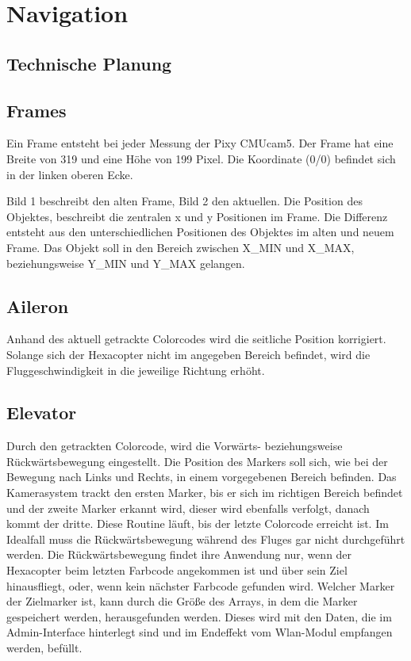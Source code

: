 \section{Navigation}

  \subsection{Technische Planung}

    \subsection*{Frames}
    Ein Frame entsteht bei jeder Messung der Pixy CMUcam5. Der Frame hat eine Breite von 319 und eine Höhe von 199 Pixel. Die Koordinate (0/0) befindet sich in der linken oberen Ecke.

    Bild 1 beschreibt den alten Frame, Bild 2 den aktuellen. Die Position des Objektes, beschreibt die zentralen x und y Positionen im Frame. Die Differenz entsteht aus den unterschiedlichen Positionen des Objektes im alten und neuem Frame. Das Objekt soll in den Bereich zwischen X\_MIN und X\_MAX, beziehungsweise Y\_MIN und Y\_MAX gelangen.


    \subsection*{Aileron}
    Anhand des aktuell getrackte Colorcodes wird die seitliche Position korrigiert. Solange sich der Hexacopter nicht im angegeben Bereich befindet, wird die Fluggeschwindigkeit in die jeweilige Richtung erhöht.

    \subsection*{Elevator}
    Durch den getrackten Colorcode, wird die Vorwärts- beziehungsweise Rückwärtsbewegung eingestellt. Die Position des Markers soll sich, wie bei der Bewegung nach Links und Rechts, in einem vorgegebenen Bereich befinden.
    Das Kamerasystem trackt den ersten Marker, bis er sich im richtigen Bereich befindet und der zweite Marker erkannt wird, dieser wird ebenfalls verfolgt, danach kommt der dritte. Diese Routine läuft, bis der letzte Colorcode erreicht ist. Im Idealfall muss die Rückwärtsbewegung während des Fluges gar nicht durchgeführt werden. Die Rückwärtsbewegung findet ihre Anwendung nur, wenn der Hexacopter beim letzten Farbcode angekommen ist und über sein Ziel hinausfliegt, oder, wenn kein nächster Farbcode gefunden wird. Welcher Marker der Zielmarker ist, kann durch die Größe des Arrays, in dem die Marker gespeichert werden, herausgefunden werden. Dieses wird mit den Daten, die im Admin-Interface hinterlegt sind und im Endeffekt vom Wlan-Modul empfangen werden, befüllt.

